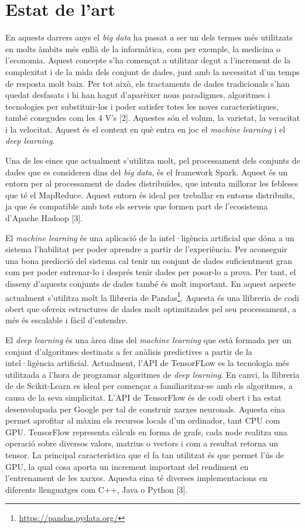 \documentclass[10pt,a4paper,twocolumn,twoside]{article}
\begin{document}
\section {Estat de l'art}
En aquests darrers anys el \textit{big data} ha passat a ser un dels termes més utilitzats en molts àmbits més enllà de la informàtica, com per exemple, la medicina o l'economia. Aquest concepte s'ha començat a utilitzar degut a l'increment de la complexitat i de la mida dels conjunt de dades, junt amb la necessitat d'un temps de resposta molt baix. Per tot això, els tractaments de dades tradicionals s'han quedat desfasats i hi han hagut d'aparèixer nous paradigmes, algoritmes i tecnologies per substituir-los i poder satisfer totes les noves característiques, també conegudes com les 4 V's [2]. Aquestes són el volum, la varietat, la veracitat i la velocitat. Aquest és el context en què entra en joc el \textit{machine learning} i el \textit{deep learning}. 

Una de les eines que actualment s'utilitza molt, pel processament dels conjunts de dades que es consideren dins del \textit{big data}, és el framework Spark. Aquest és un entorn per al processament de dades distribuïdes, que intenta millorar les febleses que té el MapReduce. Aquest entorn és ideal per treballar en entorns distribuïts, ja que és compatible amb tots els serveis que formen part de l'ecosistema d'Apache Hadoop [3].

El \textit{machine learning} és una aplicació de la intel·ligència artificial que dóna a un sistema l'habilitat per poder aprendre a partir de l'experiència. Per aconseguir una bona predicció del sistema cal tenir un conjunt de dades suficientment gran com per poder entrenar-lo i després tenir dades per posar-lo a prova. Per tant, el disseny d'aquests conjunts de dades també és molt important. En aquest aspecte actualment s'utilitza molt la llibreria de Pandas\footnote{\url{https://pandas.pydata.org/}}. Aquesta és una llibreria de codi obert que ofereix estructures de dades molt optimitzades pel seu processament, a més és escalable i fàcil d'entendre.

El \textit{deep learning} és una àrea dins del \textit{machine learning} que està formada per un conjunt d'algoritmes destinats a fer anàlisis predictives a partir de la intel·ligència artificial. Actualment, l'API de TensorFLow es la tecnologia més utilitzada a l'hora de programar algoritmes de \textit{deep learning}. En canvi, la llibreria de de Scikit-Learn es ideal per començar a familiaritzar-se amb els algoritmes, a causa de la seva simplicitat. L'API de TensorFlow és de codi obert i ha estat desenvolupada per Google per tal de construir xarxes neuronals. Aquesta eina permet aprofitar al màxim els recursos locals d'un ordinador, tant CPU com GPU. TensorFlow representa càlculs en forma de grafs, cada node realitza una operació sobre diversos valors, matrius o vectors i com a resultat retorna un tensor. La principal característica que el fa tan utilitzat és que permet l'ús de GPU, la qual cosa aporta un increment important del rendiment en l'entrenament de les xarxes. Aquesta eina té diverses implementacions en diferents llenguatges com C++, Java o Python [3].
\end{document}
